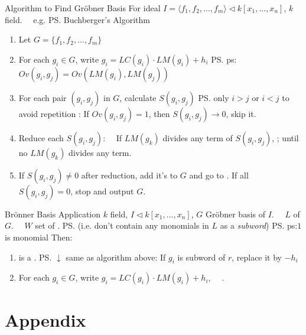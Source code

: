 \documentclass{note}
\begin{document}
\begin{MyTh}{Algorithm to Find Gröbner Basis}
    For ideal $I=\langle f_1,f_2,...,f_m\rangle \triangleleft k[x_1,...,x_n]$, $k$ field. \ \ e.g. \ps{Buchberger's Algorithm}
    \begin{enumerate}
        \item Let $G=\{f_1,f_2,...,f_m\}$
        \item For each $g_i\in G$, write $g_i=LC(g_i) \cdot LM(g_i)+h_i$ \hspace{150pt} \ps{ps: $Ov(g_i,g_j)=Ov(LM(g_i),LM(g_j))$}
        \item For each pair $(g_i,g_j)$ in $G$, calculate $S(g_i,g_j)$ \ps{only $i>j$ or $i<j$ to avoid repetition} \quad {}: If $Ov(g_i,g_j)=1$, then $S(g_i,g_j)\to0$, skip it.
        \item Reduce each $S(g_i,g_j)$: \ \  If $LM(g_k)$ divides any term of $S(g_i,g_j)$, ; until no $LM(g_k)$ divides any term.
        \item If $S(g_i,g_j)\ne0$ after reduction, add it's  to $G$ and go to . \qquad If all $S(g_i,g_j)=0$, stop and output $G$.
    \end{enumerate}
\end{MyTh}
\vspace{2pt}

\begin{MyTh}{Brönner Basis Application}
    $k$ field, $I\triangleleft k[x_1,...,x_n]$, $G$ Gröbner basis of $I$. \ \ $L$  of $G$. \ \ $W$ set of . \ps{(i.e. don't contain any monomials in $L$ as a \textit{subword})} \quad \ps{ps:$1$ is monomial}
    \qquad Then: 
    \begin{enumerate}
        \item {} is a . \qquad\qquad\quad \ps{$\downarrow$ same as algorithm above: If $g_i$ is subword of $r$, replace it by $-h_i$}
        \item For each $g_i\in G$, write $g_i=LC(g_i) \cdot LM(g_i)+h_i$,  \ \ .
    \end{enumerate}
\end{MyTh}
\vspace{2pt}


\section{Appendix}
\end{document}
